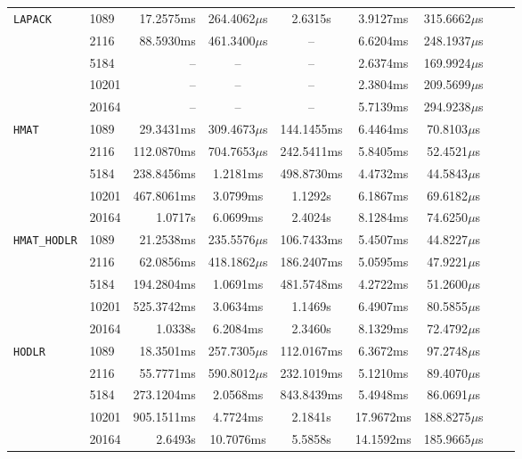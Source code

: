 \documentclass[11pt,a4paper]{article}
\begin{document}
\begin{center}
\begin{longtable}{llrcccccc}
\texttt{LAPACK} & 1089 & 17.2575ms & 264.4062$\mu$s & 2.6315s & 3.9127ms & 315.6662$\mu$s\\
 & 2116 & 88.5930ms & 461.3400$\mu$s & -- & 6.6204ms & 248.1937$\mu$s\\
 & 5184 & -- & -- & -- & 2.6374ms & 169.9924$\mu$s\\
 & 10201 & -- & -- & -- & 2.3804ms & 209.5699$\mu$s\\
 & 20164 & -- & -- & -- & 5.7139ms & 294.9238$\mu$s\\
\texttt{HMAT} & 1089 & 29.3431ms & 309.4673$\mu$s & 144.1455ms & 6.4464ms & 70.8103$\mu$s\\
 & 2116 & 112.0870ms & 704.7653$\mu$s & 242.5411ms & 5.8405ms & 52.4521$\mu$s\\
 & 5184 & 238.8456ms & 1.2181ms & 498.8730ms & 4.4732ms & 44.5843$\mu$s\\
 & 10201 & 467.8061ms & 3.0799ms & 1.1292s & 6.1867ms & 69.6182$\mu$s\\
 & 20164 & 1.0717s & 6.0699ms & 2.4024s & 8.1284ms & 74.6250$\mu$s\\
\texttt{HMAT\_HODLR} & 1089 & 21.2538ms & 235.5576$\mu$s & 106.7433ms & 5.4507ms & 44.8227$\mu$s\\
 & 2116 & 62.0856ms & 418.1862$\mu$s & 186.2407ms & 5.0595ms & 47.9221$\mu$s\\
 & 5184 & 194.2804ms & 1.0691ms & 481.5748ms & 4.2722ms & 51.2600$\mu$s\\
 & 10201 & 525.3742ms & 3.0634ms & 1.1469s & 6.4907ms & 80.5855$\mu$s\\
 & 20164 & 1.0338s & 6.2084ms & 2.3460s & 8.1329ms & 72.4792$\mu$s\\
\texttt{HODLR} & 1089 & 18.3501ms & 257.7305$\mu$s & 112.0167ms & 6.3672ms & 97.2748$\mu$s\\
 & 2116 & 55.7771ms & 590.8012$\mu$s & 232.1019ms & 5.1210ms & 89.4070$\mu$s\\
 & 5184 & 273.1204ms & 2.0568ms & 843.8439ms & 5.4948ms & 86.0691$\mu$s\\
 & 10201 & 905.1511ms & 4.7724ms & 2.1841s & 17.9672ms & 188.8275$\mu$s\\
 & 20164 & 2.6493s & 10.7076ms & 5.5858s & 14.1592ms & 185.9665$\mu$s\\
\bottomrule\end{longtable}\end{center}
\end{document}
